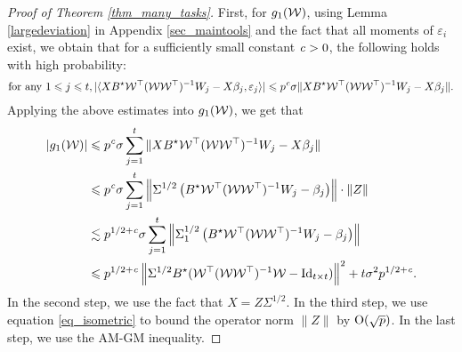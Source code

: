 \begin{proof}[Proof of Theorem \ref{thm_many_tasks}]
	First, for $g_1({\mathcal W})$, using Lemma \ref{largedeviation} in Appendix \ref{sec_maintools} and the fact that all moments of $\varepsilon_i$ exist, we obtain that for a sufficiently small constant ${\mathit{c}}>0$, the following holds with high probability:
	\[ \text{for any } 1\leqslant j \leqslant t, |\langle XB^{\star} {\mathcal W}^{\top} ({\mathcal W}{\mathcal W}^{\top})^{-1}W_j - X\beta_j, \varepsilon_j \rangle| \leqslant p^{\mathit{c}} \sigma\|XB^{\star} {\mathcal W}^{\top} ({\mathcal W}{\mathcal W}^{\top})^{-1}W_j - X\beta_j\|. \]
	Applying the above estimates into $g_1({\mathcal W})$, we get that
	\begin{align}
	  \left\lvert g_1(\mathcal W)\right\rvert    &\leqslant p^{\mathit{c}} \sigma \sum_{j=1}^t \|  {XB^{\star} {\mathcal W}^{\top} ({\mathcal W}{\mathcal W}^{\top})^{-1}W_j - X\beta_j}\| \nonumber \\
	&\leqslant  p^{\mathit{c}} \sigma \sum_{j=1}^t \left\|   \Sigma^{1/2}\left(B^{\star} {\mathcal W}^{\top} ({\mathcal W}{\mathcal W}^{\top})^{-1}W_j - \beta_j\right) \right\| \cdot \|Z\| \nonumber\\
	&\lesssim p^{1/2+{\mathit{c}}} \sigma \sum_{j=1}^t \left\|   \Sigma_1^{1/2}\left(B^{\star} {\mathcal W}^{\top} ({\mathcal W}{\mathcal W}^{\top})^{-1}W_j - \beta_j\right) \right\| \nonumber\\
	& \leqslant p^{1/2+{\mathit{c}}} \left\| \Sigma^{1/2} B^{\star} ({\mathcal W}^{\top} ({\mathcal W} {\mathcal W}^{\top})^{-1} {\mathcal W} - \operatorname{Id}_{t\times t}) \right\|^2 + t\sigma^2 p^{1/2+{\mathit{c}}}.  \label{eq_est_g1}
	\end{align}
	In the second step, we use the fact that $X=Z\Sigma^{1/2}$.
	In the third step, we use equation \eqref{eq_isometric} to bound the operator norm $\|Z\|$ by $\operatorname{O}(\sqrt{p})$.
	In the last step, we use the AM-GM inequality.


\end{proof}
